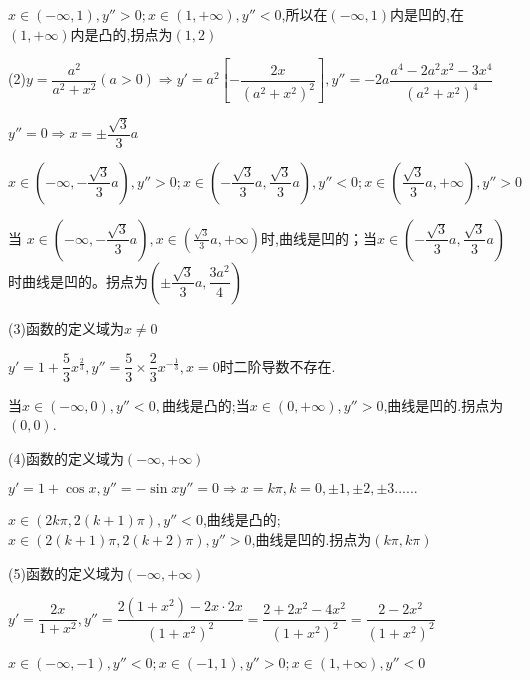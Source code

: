 $x \in \left( { - \infty ,1} \right),y'' > 0;x \in \left( {1, + \infty } \right),y'' < 0$,所以在$ \left( { - \infty ,1} \right)$内是凹的,在$\left( {1, + \infty } \right)$内是凸的,拐点为$\left( {1,2} \right)$

(2)$y = \dfrac{{{a^2}}}{{{a^2} + {x^2}}}\left( {a > 0} \right) \Rightarrow y' = {a^2}\left[ { - \dfrac{{2x}}{{{{\left( {{a^2} + {x^2}} \right)}^2}}}} \right],y'' =  - 2a\dfrac{{{a^4} - 2{a^2}{x^2} - 3{x^4}}}{{{{\left( {{a^2} + {x^2}} \right)}^4}}}$

$y'' = 0 \Rightarrow x =  \pm \dfrac{{\sqrt 3 }}{3}a$

$x \in \left( { - \infty , - \dfrac{{\sqrt 3 }}{3}a} \right),y'' > 0;x \in \left( { - \dfrac{{\sqrt 3 }}{3}a,\dfrac{{\sqrt 3 }}{3}a} \right),y'' < 0;x \in \left( {\dfrac{{\sqrt 3 }}{3}a, + \infty } \right),y'' > 0$

当 $x \in \left( { - \infty , - \dfrac{{\sqrt 3 }}{3}a} \right) ,x \in \left( {\frac{{\sqrt 3 }}{3}a, + \infty } \right)$时,曲线是凹的；当$x \in \left( { - \dfrac{{\sqrt 3 }}{3}a,\dfrac{{\sqrt 3 }}{3}a} \right)$时曲线是凹的。拐点为$\left( { \pm \dfrac{{\sqrt 3 }}{3}a,\dfrac{{3{a^2}}}{4}} \right)$

(3)函数的定义域为$x \ne 0$

$y' = 1 + \dfrac{5}{3}{x^{\frac{2}{3}}},y'' = \dfrac{5}{3} \times \dfrac{2}{3}{x^{ - \frac{1}{3}}},x = 0$时二阶导数不存在.

当$x \in \left( { - \infty ,0} \right),y'' < 0,$曲线是凸的;当$x \in \left( {0, + \infty } \right),y'' > 0$,曲线是凹的.拐点为$(0,0)$.

(4)函数的定义域为$\left( { - \infty , + \infty } \right)$

$y' = 1 + \cos x,y'' =  - \sin x$$y'' = 0 \Rightarrow x = k\pi ,k = 0, \pm 1, \pm 2, \pm 3......$

$x \in \left( {2k\pi ,2\left( {k + 1} \right)\pi } \right),y'' < 0$,曲线是凸的;$x \in \left( {2\left( {k + 1} \right)\pi ,2\left( {k + 2} \right)\pi } \right),y'' > 0$,曲线是凹的.拐点为$\left( {k\pi ,k\pi } \right)$


(5)函数的定义域为$\left( { - \infty , + \infty } \right)$

$y' = \dfrac{{2x}}{{1 + {x^2}}},y'' = \dfrac{{2\left( {1 + {x^2}} \right) - 2x \cdot 2x}}{{{{\left( {1 + {x^2}} \right)}^2}}} = \dfrac{{2 + 2{x^2} - 4{x^2}}}{{{{\left( {1 + {x^2}} \right)}^2}}} = \dfrac{{2 - 2{x^2}}}{{{{\left( {1 + {x^2}} \right)}^2}}}$

$x \in \left( { - \infty , - 1} \right),y'' < 0;x \in \left( { - 1,1} \right),y'' > 0;x \in \left( {1, + \infty } \right),y'' < 0$

